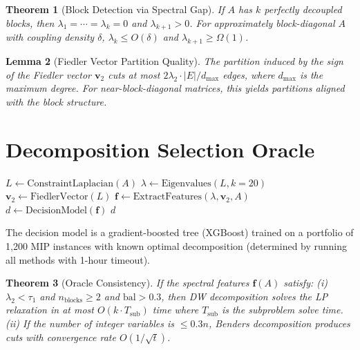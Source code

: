 \documentclass[11pt]{article}
\newtheorem{theorem}{Theorem}
\newtheorem{lemma}[theorem]{Lemma}
\begin{document}
\begin{theorem}[Block Detection via Spectral Gap]
\label{thm:gap}
If $A$ has $k$ perfectly decoupled blocks, then $\lambda_1 = \cdots = \lambda_k = 0$ and $\lambda_{k+1} > 0$. For approximately block-diagonal $A$ with coupling density $\delta$, $\lambda_k \leq O(\delta)$ and $\lambda_{k+1} \geq \Omega(1)$.
\end{theorem}

\begin{lemma}[Fiedler Vector Partition Quality]
\label{lem:fiedler}
The partition induced by the sign of the Fiedler vector $\mathbf{v}_2$ cuts at most $2\lambda_2 \cdot |E|/ d_{\max}$ edges, where $d_{\max}$ is the maximum degree. For near-block-diagonal matrices, this yields partitions aligned with the block structure.
\end{lemma}

\section{Decomposition Selection Oracle}
\label{sec:oracle}

\begin{algorithm}[t]
\SetAlgoLined
{}
$L \leftarrow \text{ConstraintLaplacian}(A)$\;
$\lambda \leftarrow \text{Eigenvalues}(L, k=20)$\;
$\mathbf{v}_2 \leftarrow \text{FiedlerVector}(L)$\;
$\mathbf{f} \leftarrow \text{ExtractFeatures}(\lambda, \mathbf{v}_2, A)$\;
$d \leftarrow \text{DecisionModel}(\mathbf{f})$\;
\Return $d$\;
\caption{SpecOracle Selection Algorithm}
\end{algorithm}

The decision model is a gradient-boosted tree (XGBoost) trained on a portfolio of 1,200 MIP instances with known optimal decomposition (determined by running all methods with 1-hour timeout).

\begin{theorem}[Oracle Consistency]
\label{thm:oracle}
If the spectral features $\mathbf{f}(A)$ satisfy: (i) $\lambda_2 < \tau_1$ and $n_{\text{blocks}} \geq 2$ and $\text{bal} > 0.3$, then DW decomposition solves the LP relaxation in at most $O(k \cdot T_{\text{sub}})$ time where $T_{\text{sub}}$ is the subproblem solve time. (ii) If the number of integer variables is $\leq 0.3n$, Benders decomposition produces cuts with convergence rate $O(1/\sqrt{t})$.
\end{theorem}
\end{document}
